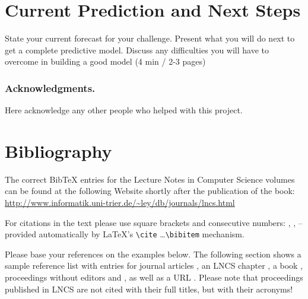 \documentclass[runningheads]{llncs}
\begin{document}
\section{Current Prediction and Next Steps}

State your current forecast for your challenge. Present what you will do next to get a complete predictive model.  Discuss any difficulties you will have to overcome in building a good model   (4 min / 2-3 pages)




\subsubsection*{Acknowledgments.} Here acknowledge any other people who helped with this project.

\section{Bibliography}\label{references}

The correct BibTeX entries for the Lecture Notes in Computer Science
volumes can be found at the following Website shortly after the
publication of the book:
\url{http://www.informatik.uni-trier.de/~ley/db/journals/lncs.html}

For citations in the text please use
square brackets and consecutive numbers: \cite{jour}, \cite{lncschap},
\cite{proceeding1} -- provided automatically
by \LaTeX 's \verb|\cite| \dots\verb|\bibitem| mechanism.

Please base your references on the
examples below. 
The following section shows a sample reference list with entries for
journal articles \cite{jour}, an LNCS chapter \cite{lncschap}, a book
\cite{book}, proceedings without editors \cite{proceeding1} and
\cite{proceeding2}, as well as a URL \cite{url}.
Please note that proceedings published in LNCS are not cited with their
full titles, but with their acronyms!
\end{document}
